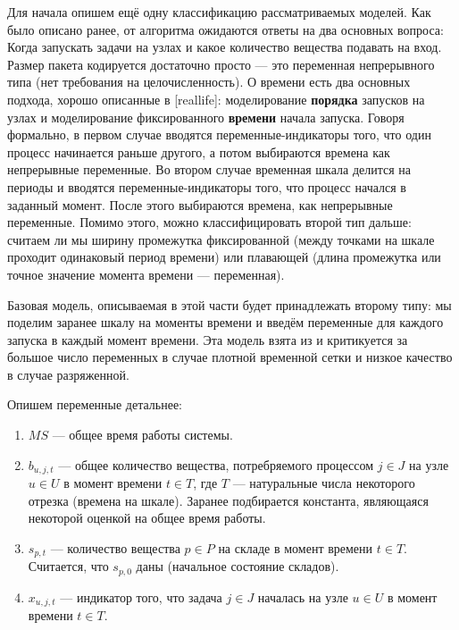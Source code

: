 \documentclass[12pt, twoside]{article}
\theoremstyle{definition}
\begin{document}
Для начала опишем ещё одну классификацию рассматриваемых моделей. Как было описано ранее, от алгоритма ожидаются ответы на два основных вопроса: Когда запускать задачи на узлах и какое количество вещества подавать на вход. Размер пакета кодируется достаточно просто --- это переменная непрерывного типа (нет требования на целочисленность). О времени есть два основных подхода, хорошо описанные в [reallife]: моделирование \textbf{порядка} запусков на узлах и моделирование фиксированного \textbf{времени} начала запуска. Говоря формально, в первом случае вводятся переменные-индикаторы того, что один процесс начинается раньше другого, а потом выбираются времена как непрерывные переменные. Во втором случае временная шкала делится на периоды и вводятся переменные-индикаторы того, что процесс начался в заданный момент. После этого выбираются времена, как непрерывные переменные. Помимо этого, можно классифицировать второй тип дальше: считаем ли мы ширину промежутка фиксированной (между точками на шкале проходит одинаковый период времени) или плавающей (длина промежутка или точное значение момента времени --- переменная).

Базовая модель, описываемая в этой части будет принадлежать второму типу: мы поделим заранее шкалу на моменты времени и введём переменные для каждого запуска в каждый момент времени. Эта модель взята из \cite{lpheuristic} и критикуется за большое число переменных в случае плотной временной сетки и низкое качество в случае разряженной.

Опишем переменные детальнее: 

\begin{enumerate}

\item $MS$ --- общее время работы системы.
\item $b_{u,j,t}$ --- общее количество вещества, потребряемого процессом $j \in J$ на узле $u \in U$ в момент времени $t \in T$, где $T$ --- натуральные числа некоторого отрезка (времена на шкале). Заранее подбирается константа, являющаяся некоторой оценкой на общее время работы.
\item $s_{p, t}$ --- количество вещества $p \in P$ на складе в момент времени $t \in T$. Считается, что $s_{p, 0}$ даны (начальное состояние складов).
\item $x_{u, j, t}$ --- индикатор того, что задача $j \in J$ началась на узле $u \in U$ в момент времени $t \in T$.

\end{enumerate}
\end{document}

